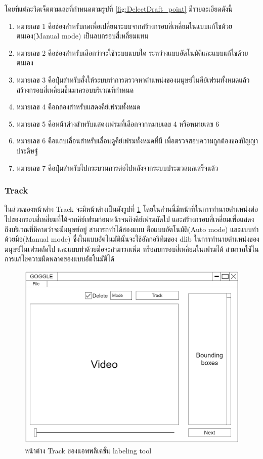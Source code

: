 โดยที่แต่ละวิดเจ็ตตามเลขที่กำหนดตามรูปที่ \ref{fig:DelectDraft_point} มีรายละเอียดดังนี้
\begin{enumerate}
	\setlength\itemsep{-0.25em}
    \item หมายเลข 1 คือช่องสำหรับกดเพื่อเปลี่ยนระบบจากสร้างกรอบสี่เหลี่ยมในแบบแก้ไขด้วยตนเอง(Manual mode) เป็นลบกรอบสี่เหลี่ยมแทน
    \item หมายเลข 2 คือช่องสำหรับเลือกว่าจะใช้ระบบแบบใด ระหว่างแบบอัตโนมัติและแบบแก้ไขด้วยตนเอง
    \item หมายเลข 3 คือปุ่มสำหรับสั่งให้ระบบทำการตรวจหาตำแหน่งของมนุษย์ในคีย์เฟรมทั้งหมดแล้วสร้างกรอบสี่เหลี่ยมขึ้นมาครอบบริเวณที่กำหนด
	\item หมายเลข 4 คือกล่องสำหรับแสดงคีย์เฟรมทั้งหมด
	\item หมายเลข 5 คือหน้าต่างสำหรับแสดงเฟรมที่เลือกจากหมายเลข 4 หรือหมายเลข 6
	\item หมายเลข 6 คือแถบเลื่อนสำหรับเลื่อนดูคีย์เฟรมทั้งหมดที่มี เพื่อตรวจสอบความถูกต้องของปัญญาประดิษฐ์
	\item หมายเลข 7 คือปุ่มสำหรับไปกระบวนการต่อไปหลังจากระบบประมวลผลเสร็จแล้ว
\end{enumerate}
\clearpage

\subsubsection{Track}
ในส่วนของหน้าต่าง Track จะมีหน้าต่างเป็นดังรูปที่ \ref{fig:TrackDraft} 
โดยในส่วนนี้มีหน้าที่ในการทำนายตำแหน่งต่อไปของกรอบสี่เหลี่ยมที่ได้จากคีย์เฟรมก่อนหน้าจนถึงคีย์เฟรมถัดไป
และสร้างกรอบสี่เหลี่ยมเพื่อแสดงถึงบริเวณที่มีคาดว่าจะมีมนุษย์อยู่ 
สามารถทำได้สองแบบ คือแบบอัตโนมัติ(Auto mode) และแบบทำด้วยมือ(Manual mode) 
ซึ่งในแบบอัตโนมัตินั้นจะใช้อัลกอริทึมของ dlib ในการทำนายตำแหน่งของมนุษย์ในเฟรมถัดไป 
และแบบทำด้วยมือจะสามารถเพิ่ม หรือลบกรอบสี่เหลี่ยมในเฟรมได้ 
สามารถใช้ในการแก้ไขความผิดพลาดของแบบอัตโนมัติได้
\begin{figure}[!ht]
    \centering
    \includegraphics[width=1\textwidth]{chapter3/images/3_6/TrackDraft.png}
    \caption{หน้าต่าง Track ของแอพพลิเคชั่น labeling tool}
    \label{fig:TrackDraft}
\end{figure}
